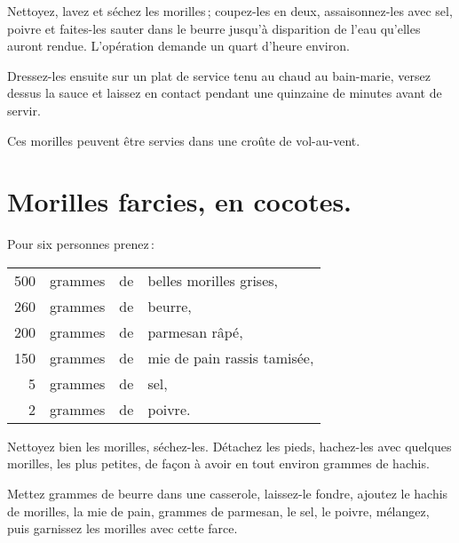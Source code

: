 Nettoyez, lavez et séchez les morilles ; coupez-les en deux, assaisonnez-les
avec sel, poivre et faites-les sauter dans le beurre jusqu'à disparition de
l'eau qu'elles auront rendue. L'opération demande un quart d'heure environ.

Dressez-les ensuite sur un plat de service tenu au chaud au bain-marie, versez
dessus la sauce et laissez en contact pendant une quinzaine de minutes avant de servir.

\medskip

Ces morilles peuvent être servies dans une croûte de vol-au-vent.

\section*{\centering Morilles farcies, en cocotes.}
{}

Pour six personnes prenez :

\footnotesize
\begin{longtable}{rrrp{16em}}
    500 & grammes & de & belles morilles grises,                                                          \\
    260 & grammes & de & beurre,                                                                          \\
    200 & grammes & de & parmesan râpé,                                                                   \\
    150 & grammes & de & mie de pain rassis tamisée,                                                      \\
      5 & grammes & de & sel,                                                                             \\
      2 & grammes & de & poivre.                                                                          \\
\end{longtable}
\normalsize

Nettoyez bien les morilles, séchez-les. Détachez les pieds, hachez-les avec
quelques morilles, les plus petites, de façon à avoir en tout environ
{\mmm} grammes de hachis.

Mettez {\mmm} grammes de beurre dans une casserole, laissez-le fondre,
ajoutez le hachis de morilles, la mie de pain, {\mmm} grammes de
parmesan, le sel, le poivre, mélangez, puis garnissez les morilles avec cette
farce.

